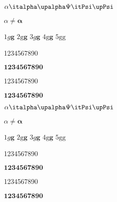 \documentclass[
ngerman,
]{tudscrreprt}
\begin{document}
\def\testmathoutput{
$\alpha \italpha \upalpha \Psi \itPsi \upPsi$\par
$\alpha \not= \bm{\alpha}$\par
$1 g \bm{g}$
$2 \mathrm{g \bm{g}}$
$3 {g} \bm{{g}}$
$4 \mathrm{{g} \bm{{g}}}$
$5 \mathrm{g} \bm{\mathrm{g}}$
\par
\blindtext
\par
1234567890
\par
$\mathbf{1234567890}$
\par
\boldmath
\blindtext
\par
1234567890
\par
$\mathbf{1234567890}$
}

\testmathoutput

\clearpage

\testmathoutput

\clearpage

\blinddocument
\end{document}
